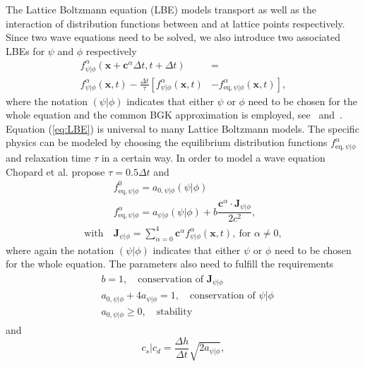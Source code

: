 \documentclass{article}
\renewcommand{\vec}{\boldsymbol}        %
\newcommand{\argum}{(\vec{x},t)}
\begin{document}
The Lattice Boltzmann equation (LBE) models transport as well as the interaction of distribution functions between and at lattice points respectively. Since two wave equations need to be solved, we also introduce two associated LBEs for $\psi$ and $\phi$ respectively
\begin{align}
    f^{\alpha}_{\psi\vert\phi} \left( \vec{x} + \vec{c}^{\alpha} \Delta{t}, t + \Delta{t} \right) & =  \nonumber\\
    f^{\alpha}_{\psi\vert\phi} \argum - \frac{\Delta{t}}{\tau} \left[ f^{\alpha}_{\psi\vert\phi} \argum \right.& \left. -   f^{\alpha}_{\text{eq},\psi\vert\phi} \argum \right],
    \label{eq:LBE}
\end{align}
where the notation $(\psi\vert\phi)$ indicates that either $\psi$ or $\phi$ need to be chosen for the whole equation and the common BGK approximation is employed, see~\cite{bhatnagar_model_1954} and~\cite{welander_temperature_1954}.
Equation (\ref{eq:LBE}) is universal to many Lattice Boltzmann models. The specific physics can be modeled by choosing the equilibrium distribution functions $f^{\alpha}_{\text{eq},\psi\vert\phi}$ and relaxation time $\tau$ in a certain way. In order to model a wave equation Chopard et al. propose $\tau=0.5\Delta{t}$ and 
\begin{align}
    &f^{0}_{\text{eq},\psi\vert\phi} = a_{0,\psi\vert\phi} (\psi\vert\phi) \nonumber\\ 
    &f^{\alpha}_{\text{eq},\psi\vert\phi} = a_{\psi\vert\phi}(\psi\vert\phi) + b \dfrac{\vec{c}^\alpha\cdot\vec{J}_{\psi\vert\phi}}{2c^2}, \nonumber\\
    \text{with}\ &\vec{J}_{\psi\vert\phi} = \sum_{\alpha=0}^{4} \vec{c}^{\alpha} f^{\alpha}_{\psi\vert\phi} \argum, \ \text{for }\alpha \neq 0,
    \label{eq:feq}
\end{align}
where again the notation $(\psi\vert\phi)$ indicates that either $\psi$ or $\phi$ need to be chosen for the whole equation.
The parameters also need to fulfill the requirements
\begin{align}
\begin{split}
   & b=1, \quad \text{conservation of } \vec{J}_{\psi\vert\phi}\\
   & a_{0,\psi\vert\phi}+ 4a_{\psi\vert\phi} = 1, \quad \text{conservation of } {\psi\vert\phi}\\
   & a_{0,\psi\vert\phi}\ge{0}, \quad {\text{stability}}
   \end{split}
   \label{eq:feq_req}
\end{align}
and 
\begin{equation}
    c_s\vert{c_d} =\dfrac{\Delta{h}}{\Delta{t}}\sqrt{2a_{\psi\vert\phi}},
    \label{eq:parameters_to_wavespeed_relation}
\end{equation}
\end{document}
